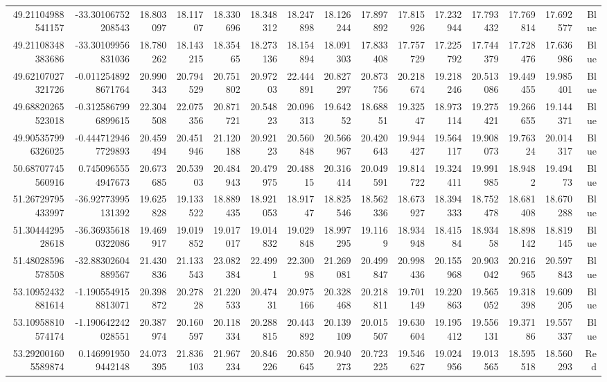 \begin{center}
\begin{longtable}{rrrrrrrrrrrrrrr}
49.21104988541157 & -33.30106752208543 & 18.803097 & 18.11707 & 18.330696 & 18.348312 & 18.247898 & 18.126244 & 17.897892 & 17.815926 & 17.232944 & 17.793432 & 17.769814 & 17.692577 & Blue \\
49.21108348383686 & -33.30109956831036 & 18.780262 & 18.143215 & 18.35465 & 18.273136 & 18.154894 & 18.091303 & 17.833408 & 17.757729 & 17.225792 & 17.744379 & 17.728476 & 17.636986 & Blue \\
49.62107027321726 & -0.0112548928671764 & 20.990343 & 20.794529 & 20.751802 & 20.97203 & 22.444891 & 20.827297 & 20.873756 & 20.218674 & 19.218246 & 20.513086 & 19.449455 & 19.985401 & Blue \\
49.68820265523018 & -0.3125867996899615 & 22.304508 & 22.075356 & 20.871721 & 20.54823 & 20.096313 & 19.64252 & 18.68851 & 19.32547 & 18.973114 & 19.275421 & 19.266655 & 19.144371 & Blue \\
49.905357996326025 & -0.4447129467729893 & 20.459494 & 20.451946 & 21.120188 & 20.92123 & 20.560848 & 20.566967 & 20.420643 & 19.944427 & 19.564117 & 19.908073 & 19.76324 & 20.014317 & Blue \\
50.68707745560916 & 0.7450965554947673 & 20.673685 & 20.53903 & 20.484943 & 20.479975 & 20.48815 & 20.316414 & 20.049591 & 19.814722 & 19.324411 & 19.991985 & 18.9482 & 19.49473 & Blue \\
51.26729795433997 & -36.92773995131392 & 19.625828 & 19.133522 & 18.889435 & 18.921053 & 18.91747 & 18.825546 & 18.562336 & 18.673927 & 18.394333 & 18.752478 & 18.681408 & 18.670288 & Blue \\
51.3044429528618 & -36.369356180322086 & 19.469917 & 19.019852 & 19.017017 & 19.014832 & 19.029848 & 18.997295 & 19.1169 & 18.934948 & 18.41584 & 18.93458 & 18.898142 & 18.819145 & Blue \\
51.48028596578508 & -32.88302604889567 & 21.430836 & 21.133543 & 23.082384 & 22.4991 & 22.30098 & 21.269081 & 20.499847 & 20.998436 & 20.155968 & 20.903042 & 20.216965 & 20.597843 & Blue \\
53.10952432881614 & -1.1905549158813071 & 20.398872 & 20.27828 & 21.220533 & 20.47431 & 20.975166 & 20.328468 & 20.218811 & 19.701149 & 19.220863 & 19.565052 & 19.318398 & 19.609205 & Blue \\
53.10958810574174 & -1.190642242028551 & 20.387974 & 20.160597 & 20.118334 & 20.288815 & 20.443892 & 20.139109 & 20.015507 & 19.630604 & 19.195412 & 19.556131 & 19.37186 & 19.557337 & Blue \\
53.292001605589874 & 0.1469919509442148 & 24.073395 & 21.836103 & 21.967234 & 20.846226 & 20.850645 & 20.940273 & 20.723225 & 19.546627 & 19.024956 & 19.013565 & 18.595518 & 18.560293 & Red \\

\end{longtable}
\end{center}
